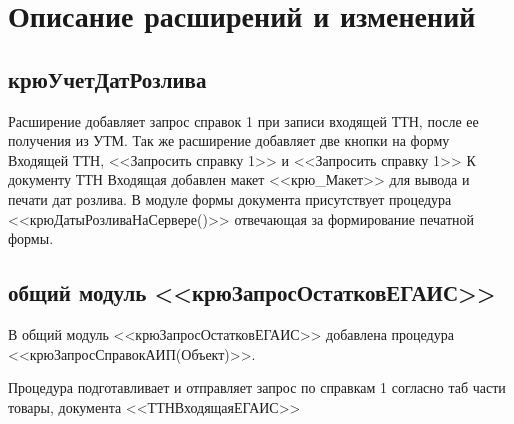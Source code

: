\section{Описание расширений и изменений}
\subsection{крюУчетДатРозлива}
Расширение добавляет запрос справок 1 при записи входящей ТТН, после ее получения из УТМ. Так же расширение добавляет две кнопки на форму Входящей ТТН, <<Запросить справку 1>> и <<Запросить справку 1>> К документу ТТН Входящая добавлен макет <<крю\_Макет>> для вывода и печати дат розлива. В модуле формы документа присутствует процедура <<крюДатыРозливаНаСервере()>> отвечающая за формирование печатной формы.

\subsection{общий модуль <<крюЗапросОстатковЕГАИС>>}

В общий модуль <<крюЗапросОстатковЕГАИС>> добавлена процедура <<крюЗапросСправокАИП(Объект)>>.

Процедура подготавливает и отправляет запрос по справкам 1 согласно таб части товары, документа <<ТТНВходящаяЕГАИС>>

